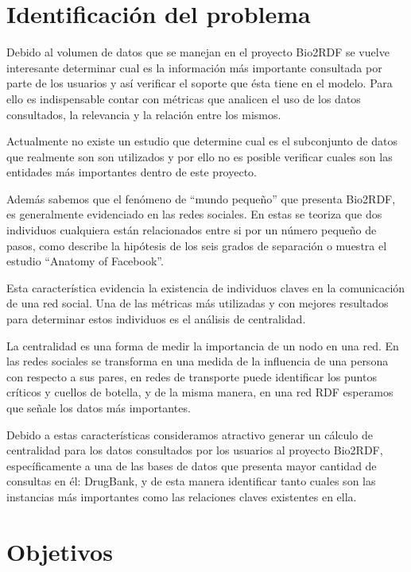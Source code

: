 \section{Identificación del problema}\label{sec:idpro}
Debido al volumen de datos que se manejan en el proyecto Bio2RDF se vuelve
interesante determinar cual es la información más importante consultada por
parte de los usuarios y así verificar el soporte que ésta tiene en el modelo. 
Para ello es indispensable contar con métricas que analicen el uso de los datos
consultados, la relevancia y la relación entre los mismos.

Actualmente no existe un estudio que determine cual es el subconjunto de datos
que realmente son son utilizados y por ello no es posible verificar cuales son
las entidades más importantes dentro de este proyecto.

Además sabemos que el fenómeno de ``mundo pequeño'' que presenta Bio2RDF, es
generalmente evidenciado en las redes sociales. En estas se 
teoriza que dos individuos cualquiera están relacionados entre si por un número
pequeño de pasos, como describe la hipótesis de los seis grados de separación o
muestra el estudio ``Anatomy of Facebook''\cite{ugander2011anatomy}.

Esta característica evidencia la existencia de individuos claves en la
comunicación de una red social. 
Una de las métricas más utilizadas y con mejores resultados para determinar
estos individuos es el análisis de centralidad.

La centralidad es una forma de medir la importancia de un nodo en una red.
En las redes sociales se transforma en una medida de la influencia de una
persona con respecto a sus pares, en redes de transporte puede identificar los
puntos críticos y cuellos de botella, y de la misma manera, en una red RDF
esperamos que señale los datos más importantes.

Debido a estas características consideramos atractivo generar un cálculo de
centralidad para los datos consultados por los usuarios al proyecto Bio2RDF,
específicamente a una de las bases de datos que presenta mayor cantidad de
consultas en él: DrugBank, y de esta manera identificar tanto cuales son las
instancias más importantes como las relaciones claves existentes en ella.

\section{Objetivos}\label{sec:objs}

